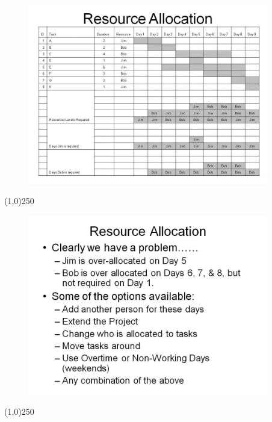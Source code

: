 \begin{frame}
\begin{figure}
	\centering
		\includegraphics[width = 10.5cm]{oldnotes/Slide37.jpg}
\end{figure}
\end{frame}
\begin{center}\line(1,0){250}\end{center}





\begin{frame}
\begin{figure}
	\centering
		\includegraphics[width = 10.5cm]{oldnotes/Slide38.jpg}
\end{figure}
\end{frame}
\begin{center}\line(1,0){250}\end{center}





